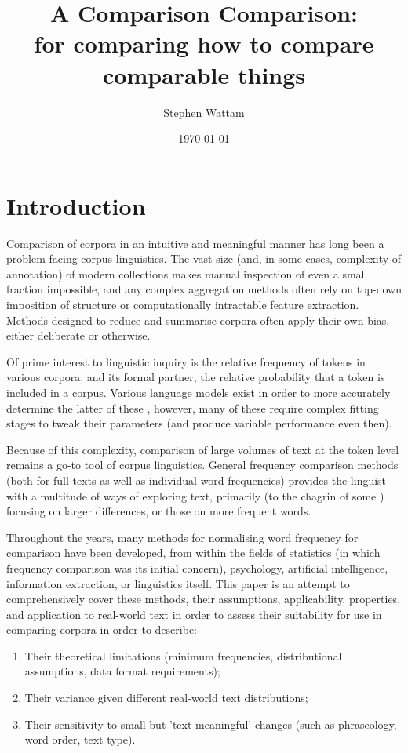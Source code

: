 \documentclass[11pt]{article}
\begin{document}
\title{A Comparison Comparison:\\
\small{for comparing how to compare comparable things}}
\author{Stephen Wattam}
\date{\today}
\maketitle

\tableofcontents{}
\pagebreak

\section{Introduction}
Comparison of corpora in an intuitive and meaningful manner has long been a problem facing corpus linguistics. The vast size (and, in some cases, complexity of annotation) of modern collections makes manual inspection of even a small fraction impossible, and any complex aggregation methods often rely on top-down imposition of structure or computationally intractable feature extraction.  Methods designed to reduce and summarise corpora %
often apply their own bias, either  deliberate or otherwise.

Of prime interest to linguistic inquiry is the relative frequency of tokens in various corpora, and its formal partner, the relative probability that a token is included in a corpus. Various language models exist in order to more accurately determine the latter of these %
, however, many of these require complex fitting stages to tweak their parameters (and produce variable performance even then).

Because of this complexity, comparison of large volumes of text at the token level remains a go-to tool of corpus linguistics. General frequency comparison methods (both for full texts as well as individual word frequencies) provides the linguist with a multitude of ways of exploring text, primarily (to the chagrin of some %
) focusing on larger differences, or those on more frequent words.

Throughout the years, many methods for normalising word frequency for comparison have been developed, from within the fields of statistics (in which frequency comparison was its initial concern), psychology, artificial intelligence, information extraction, or linguistics itself.  This paper is an attempt to comprehensively cover these methods, their assumptions, applicability, properties, and application to real-world text in order to assess their suitability for use in comparing corpora in order to describe:
\begin{enumerate}
\item Their theoretical limitations (minimum frequencies, distributional assumptions, data format requirements);
\item Their variance given different real-world text distributions;
\item Their sensitivity to small but 'text-meaningful' changes (such as phraseology, word order, text type).
\end{enumerate}
\end{document}
